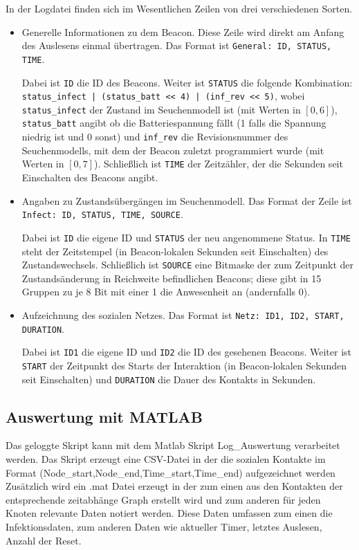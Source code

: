 \documentclass[11pt,ngerman]{scrartcl} %
\begin{document}
In der Logdatei finden sich im Wesentlichen Zeilen von drei verschiedenen Sorten.
\begin{itemize}
\item Generelle Informationen zu dem Beacon. Diese Zeile wird direkt am
  Anfang des Auslesens einmal übertragen. Das Format ist
  \verb!General: ID, STATUS, TIME!.

  Dabei ist \verb!ID! die ID des Beacons. Weiter ist \verb!STATUS! die
  folgende Kombination: \verb!status_infect | (status_batt << 4) | (inf_rev << 5)!,
  wobei \verb!status_infect! der Zustand im Seuchenmodell ist (mit Werten in
  $[0,6]$), \verb!status_batt! angibt ob die Batteriespannung fällt (1 falls
  die Spannung niedrig ist und 0 sonst) und \verb!inf_rev! die
  Revisionsnummer des Seuchenmodells, mit dem der Beacon zuletzt
  programmiert wurde (mit Werten in $[0,7]$). Schließlich ist \verb!TIME!
  der Zeitzähler, der die Sekunden seit Einschalten des Beacons angibt.
\item Angaben zu Zustandsübergängen im Seuchenmodell. Das Format der Zeile ist
  \verb!Infect: ID, STATUS, TIME, SOURCE!.

  Dabei ist \verb!ID! die eigene ID und \verb!STATUS! der neu angenommene
  Status. In \verb!TIME! steht der Zeitstempel (in Beacon-lokalen Sekunden
  seit Einschalten) des Zustandswechsels. Schließlich ist \verb!SOURCE! eine
  Bitmaske der zum Zeitpunkt der Zustandsänderung in Reichweite befindlichen
  Beacons; diese gibt in 15 Gruppen zu je 8 Bit mit einer 1 die Anwesenheit
  an (andernfalls 0).
\item Aufzeichnung des sozialen Netzes. Das Format ist
  \verb!Netz: ID1, ID2, START, DURATION!.

  Dabei ist \verb!ID1! die eigene ID und \verb!ID2! die ID des gesehenen
  Beacons. Weiter ist \verb!START! der Zeitpunkt des Starts der Interaktion
  (in Beacon-lokalen Sekunden seit Einschalten) und \verb!DURATION! die
  Dauer des Kontakts in Sekunden.
\end{itemize}

\subsection{Auswertung mit MATLAB}

Das geloggte Skript kann mit dem Matlab Skript Log\_Auswertung verarbeitet werden. Das Skript erzeugt eine CSV-Datei in der die sozialen Kontakte im Format (Node\_start,Node\_end,Time\_start,Time\_end)  aufgezeichnet werden
Zusätzlich wird ein .mat Datei erzeugt in der zum einen aus den Kontakten der entsprechende zeitabhänge Graph erstellt wird und zum anderen für jeden Knoten relevante Daten notiert werden. Diese Daten umfassen zum einen die Infektionsdaten, zum anderen Daten wie aktueller Timer, letztes Auslesen, Anzahl der Reset. 
\end{document}
